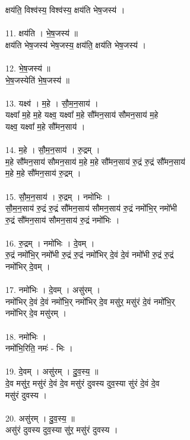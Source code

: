 क्षय॑ति॒ विश्व॑स्य॒ विश्व॑स्य॒ क्षय॑ति भेष॒जस्य॑ ।\\
\\
11. क्षय॑ति । भे॒ष॒जस्य॑ ॥\\
क्षय॑ति भेष॒जस्य॑ भेष॒जस्य॒ क्षय॑ति॒ क्षय॑ति भेष॒जस्य॑ ।\\
\\
12. भे॒ष॒जस्य॑ ॥\\
भे॒ष॒जस्येति॑ भे॒ष॒जस्य॑ ॥\\
\\
13. यक्ष्व॑ । म॒हे । सौ॒म॒न॒साय॑ ।\\
यक्ष्वा᳚ म॒हे म॒हे यक्ष्व॒ यक्ष्वा᳚ म॒हे सौ᳚मन॒साय॑ सौमन॒साय॑ म॒हे\\
यक्ष्व॒ यक्ष्वा᳚ म॒हे सौ᳚मन॒साय॑ ।\\
\\
14. म॒हे । सौ॒म॒न॒साय॑ । रु॒द्रम् ।\\
म॒हे सौ᳚मन॒साय॑ सौमन॒साय॑ म॒हे म॒हे सौ᳚मन॒साय॑ रु॒द्रं रु॒द्रं सौ᳚मन॒साय॑\\
म॒हे म॒हे सौ᳚मन॒साय॑ रु॒द्रम् ।\\
\\
15. सौ॒म॒न॒साय॑ । रु॒द्रम् । नमो॑भिः ।\\
सौ॒म॒न॒साय॑ रु॒द्रं रु॒द्रं सौ᳚मन॒साय॑ सौमन॒साय॑ रु॒द्रं नमो᳚भि॒र् नमो᳚भी\\
रु॒द्रं सौ᳚मन॒साय॑ सौमन॒साय॑ रु॒द्रं नमो᳚भिः ।\\
\\
16. रु॒द्रम् । नमो॑भिः । दे॒वम् ।\\
रु॒द्रं नमो᳚भि॒र् नमो᳚भी रु॒द्रं रु॒द्रं नमो᳚भिर् दे॒वं दे॒वं नमो᳚भी रु॒द्रं रु॒द्रं\\
नमो᳚भिर् दे॒वम् ।\\
\\
17. नमो॑भिः । दे॒वम् । असु॑रम् ।\\
नमो᳚भिर् दे॒वं दे॒वं नमो᳚भि॒र् नमो᳚भिर् दे॒व मसु॑र॒ मसु॑रं दे॒वं नमो᳚भि॒र्\\
नमो᳚भिर् दे॒व मसु॑रम् ।\\
\\
18. नमो॑भिः ।\\
नमो᳚भि॒रिति॒ नमः॑ - भिः ।\\
\\
19. दे॒वम् । असु॑रम् । दु॒व॒स्य॒ ॥\\
दे॒व मसु॑र॒ मसु॑रं दे॒वं दे॒व मसु॑रं दुवस्य दुव॒स्या सु॑रं दे॒वं दे॒व\\
मसु॑रं दुवस्य ।\\
\\
20. असु॑रम् । दु॒व॒स्य॒ ॥\\
असु॑रं दुवस्य दुव॒स्या सु॑र॒ मसु॑रं दुवस्य ।\\
